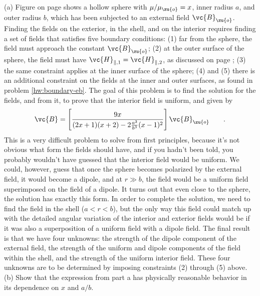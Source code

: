   (a) Figure  on page \pageref{fig:eg-magnetic-shielding-sphere} shows a hollow sphere with $\mu/\mu_\zu{o}=x$,
  inner radius $a$, and outer radius $b$, which has been subjected to an external field $\vc{B}_\zu{o}$. Finding the fields on the exterior, in the
  shell, and on the interior requires finding a set of fields that satisfies five boundary conditions: (1) far from the sphere, the field
  must approach the constant $\vc{B}_\zu{o}$; (2) at the outer surface of the sphere, the field must have
  $\vc{H}_{\parallel,1}=\vc{H}_{\parallel,2}$, as discussed on page  \pageref{fig:permeability-boundary}; (3) the same constraint applies
  at the inner surface of the sphere; (4) and (5) there is an additional constraint on the fields at the inner and outer surfaces, as found in problem
  \ref{hw:boundary-eb}. The goal of this problem is to find the solution for the fields, and from it, to prove that the interior field
  is uniform, and given by
  \begin{equation*}
       \vc{B} = \left[\frac{9x}{(2x+1)(x+2)-2\frac{a^3}{b^3}(x-1)^2}\right]\vc{B}_\zu{o} \qquad .
  \end{equation*}
  This is a very difficult problem to solve from first principles, because it's not obvious what form the fields should have, and if you hadn't been
  told, you probably wouldn't have guessed that the interior field would be uniform. We could, however, guess that once the sphere becomes polarized
  by the external field, it would become a dipole, and at $r\gg b$, the field would be a uniform field superimposed on the field of a dipole.
  It turns out that even close to the sphere, the solution has exactly this form. In order to complete the solution, we need to find the field
  in the shell ($a<r<b$), but the only way this field could match up with the detailed angular variation of the interior and exterior fields
  would be if it was also a superposition of a uniform field with a dipole field. The final result is that we have four unknowns: the strength
  of the dipole component of the external field, the strength of the uniform and dipole components of the field within the shell, and the
  strength of the uniform interior field. These four unknowns are to be determined by imposing constraints (2) through (5) above.\hwendpart
  (b) Show that the expression from part a has physically reasonable behavior in its dependence on $x$ and $a/b$.  
